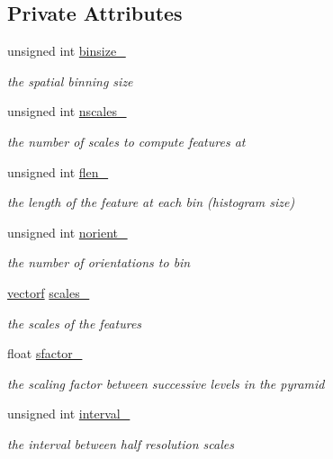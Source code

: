 \subsection*{\-Private \-Attributes}
\begin{DoxyCompactItemize}
\item 
unsigned int \hyperlink{classHOGFeatures_a9226774c97946f68829cec3d83fdbe20}{binsize\-\_\-}
\begin{DoxyCompactList}\small\item\em the spatial binning size \end{DoxyCompactList}\item 
unsigned int \hyperlink{classHOGFeatures_a503011deedc5ff736fa135149a2919f9}{nscales\-\_\-}
\begin{DoxyCompactList}\small\item\em the number of scales to compute features at \end{DoxyCompactList}\item 
unsigned int \hyperlink{classHOGFeatures_ae895d79d7725afb35846cd3e08be6b74}{flen\-\_\-}
\begin{DoxyCompactList}\small\item\em the length of the feature at each bin (histogram size) \end{DoxyCompactList}\item 
unsigned int \hyperlink{classHOGFeatures_a549b2c1d78c2fcabe8d2692f7f466687}{norient\-\_\-}
\begin{DoxyCompactList}\small\item\em the number of orientations to bin \end{DoxyCompactList}\item 
\hyperlink{types_8hpp_a4da5db3ee9e284f719ef5764dbadffc8}{vectorf} \hyperlink{classHOGFeatures_a27490a8c33c7ffbfdeedafc5af0ad544}{scales\-\_\-}
\begin{DoxyCompactList}\small\item\em the scales of the features \end{DoxyCompactList}\item 
float \hyperlink{classHOGFeatures_a45b232ca94e93b4f30d342374e62578f}{sfactor\-\_\-}
\begin{DoxyCompactList}\small\item\em the scaling factor between successive levels in the pyramid \end{DoxyCompactList}\item 
unsigned int \hyperlink{classHOGFeatures_a5e73ec994a2f8cae1b466bad5a9cb2a3}{interval\-\_\-}
\begin{DoxyCompactList}\small\item\em the interval between half resolution scales \end{DoxyCompactList}\end{DoxyCompactItemize}


